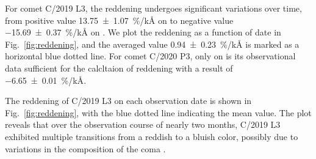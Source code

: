 For comet C/2019 L3, the reddening undergoes significant variations over time, from positive value {\qty{13.75 +- 1.07}{\percent/\kilo\angstrom}} on  to negative value {\qty{-15.69 +- 0.37}{\percent/\kilo\angstrom}} on . We plot the reddening as a function of date in Fig.~\ref{fig:reddening}, and the averaged value {\qty{0.94 +- 0.23}{\percent/\kilo\angstrom}} is marked as a horizontal blue dotted line. For comet C/2020 P3, only on  is its observational data sufficient for the calcltaion of reddening with a result of {\qty{-6.65 +- 0.01}{\percent/\kilo\angstrom}}. 

The reddening of C/2019 L3 on each observation date is shown in Fig.~\ref{fig:reddening}, with the blue dotted line indicating the mean value. The plot reveals that over the observation course of nearly two months, C/2019 L3 exhibited multiple transitions from a reddish to a bluish color, possibly due to variations in the composition of the coma \citep{ivanova_colour_2017}. 

